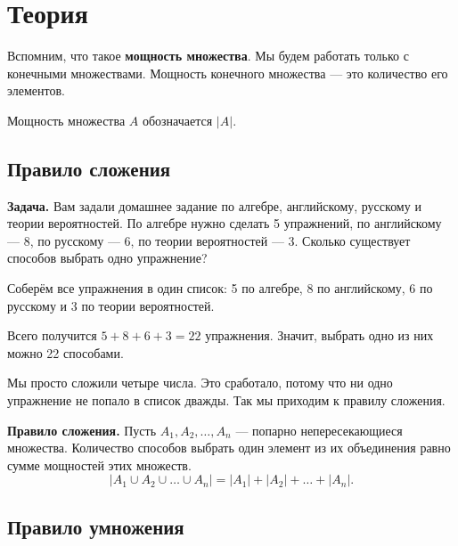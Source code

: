 \section{Теория}

Вспомним, что такое \textbf{мощность множества}. Мы будем работать только с конечными множествами. Мощность конечного множества — это количество его элементов.

\begin{designation}
    Мощность множества \(A\) обозначается \(\lvert A\rvert\).
\end{designation}

\subsection{Правило сложения}

\begin{example}\label{example-theory-1}
\textbf{Задача.} Вам задали домашнее задание по алгебре, английскому, русскому и теории вероятностей. По алгебре нужно сделать 5 упражнений, по английскому — 8, по русскому — 6, по теории вероятностей — 3. Сколько существует способов выбрать одно упражнение?
\end{example}

\begin{solution}\label{solution-combinatorics-rules-theory-1}
Соберём все упражнения в один список: 5 по алгебре, 8 по английскому, 6 по русскому и 3 по теории вероятностей.

Всего получится $5+8+6+3=22$ упражнения. Значит, выбрать одно из них можно 22 способами.

Мы просто сложили четыре числа. Это сработало, потому что ни одно упражнение не попало в список дважды. Так мы приходим к правилу сложения.
\end{solution}

\begin{definition}
    \textbf{Правило сложения.} Пусть \(A_1,A_2,\dots,A_n\) — попарно непересекающиеся множества. Количество способов выбрать один элемент из их объединения равно сумме мощностей этих множеств.
    \[
        \lvert A_1\cup A_2\cup\dots\cup A_n\rvert=\lvert A_1\rvert+\lvert A_2\rvert+\dots+\lvert A_n\rvert.
    \]
\end{definition}

\subsection{Правило умножения}

